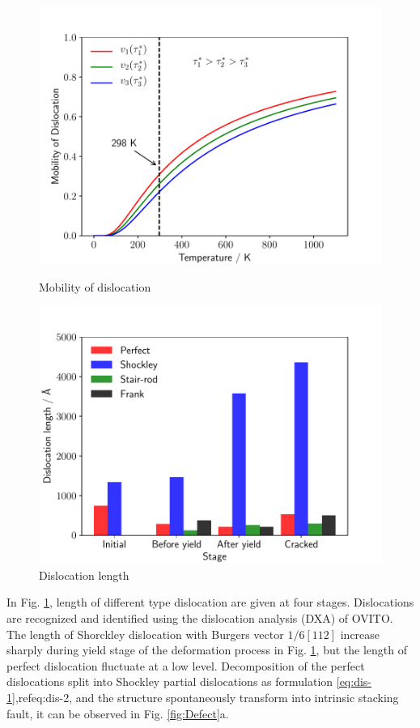 \documentclass[metals,article,submit,moreauthors,pdftex,10pt,a4paper]{Definitions/mdpi}
\begin{document}
\begin{figure}[ht]
	\centering
	\begin{minipage}{0.495\textwidth}
		\includegraphics[width=1\linewidth]{img/temp}
		\centering
		\caption{Mobility of dislocation}
		\label{fig:temp}
	\end{minipage}	
	\hfill
	\begin{minipage}{0.495\textwidth}		
		\includegraphics[width=1\linewidth]{img/disum}
		\centering
		\caption{Dislocation length}
		\label{fig:disum}
	\end{minipage}
\end{figure}


In Fig. \ref{fig:disum}, length of different type dislocation are given at four stages. Dislocations are recognized and identified using the dislocation analysis (DXA) of OVITO. The length of Shorckley dislocation with Burgers vector $1/6[1 1 2]$ increase sharply during yield stage of the deformation process in Fig. \ref{fig:disum}, but the length of perfect dislocation fluctuate at a low level. Decomposition of the perfect  dislocations split into Shockley partial dislocations as formulation \ref{eq:dis-1},ref{eq:dis-2}, and the structure spontaneously transform into intrinsic stacking fault, it can be observed in Fig. \ref{fig:Defect}a. 
\end{document}
